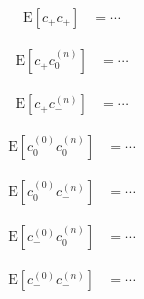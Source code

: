 \documentclass{article}
\begin{document}











\begin{align}
    \mathrm{E}[c_+ c_+]
        & = \cdots
\end{align}


\begin{align}
    \mathrm{E}[c_+ c_0^{(n)}]
        & = \cdots
\end{align}


\begin{align}
    \mathrm{E}[c_+ c_{-}^{(n)}]
        & = \cdots
\end{align}


\begin{align}
    \mathrm{E}[c_0^{(0)} c_0^{(n)}]
        & = \cdots
\end{align}


\begin{align}
    \mathrm{E}[c_0^{(0)} c_-^{(n)}]
        & = \cdots
\end{align}


\begin{align}
    \mathrm{E}[c_-^{(0)} c_0^{(n)}]
        & = \cdots
\end{align}


\begin{align}
    \mathrm{E}[c_-^{(0)} c_-^{(n)}]
        & = \cdots
\end{align}

\end{document}
